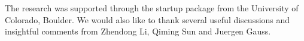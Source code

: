 \documentclass[10pt,aps,prb,twocolumn,amsmath,amssymb,superscriptaddress]{revtex4-1}
\begin{document}


\begin{acknowledgements}
The research was supported through the startup package from the University of Colorado, Boulder. We would also like to thank several useful discussions and insightful comments from Zhendong Li, Qiming Sun and Juergen Gauss.
\end{acknowledgements}


%
%

\end{document}
